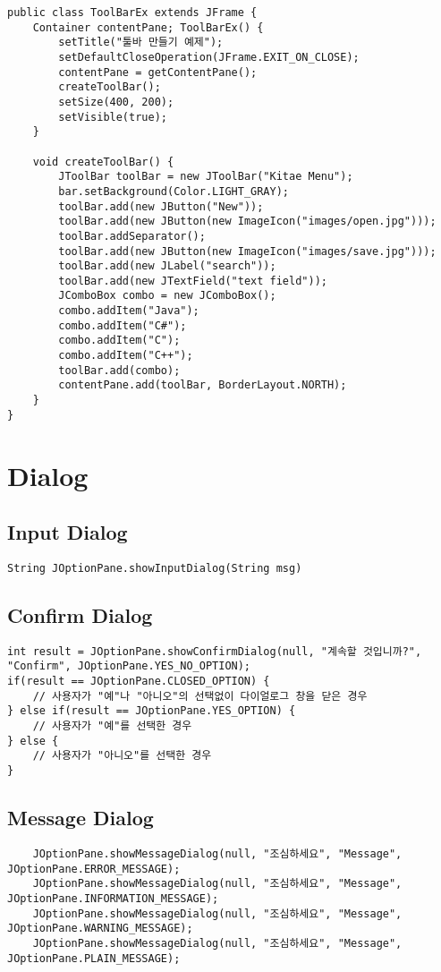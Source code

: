 \begin{verbatim}
public class ToolBarEx extends JFrame {
    Container contentPane; ToolBarEx() {
        setTitle("툴바 만들기 예제");
        setDefaultCloseOperation(JFrame.EXIT_ON_CLOSE);
        contentPane = getContentPane();
        createToolBar();
        setSize(400, 200);
        setVisible(true);
    }

    void createToolBar() {
        JToolBar toolBar = new JToolBar("Kitae Menu");
        bar.setBackground(Color.LIGHT_GRAY);
        toolBar.add(new JButton("New"));
        toolBar.add(new JButton(new ImageIcon("images/open.jpg")));
        toolBar.addSeparator();
        toolBar.add(new JButton(new ImageIcon("images/save.jpg")));
        toolBar.add(new JLabel("search"));
        toolBar.add(new JTextField("text field"));
        JComboBox combo = new JComboBox();
        combo.addItem("Java");
        combo.addItem("C#");
        combo.addItem("C");
        combo.addItem("C++");
        toolBar.add(combo);
        contentPane.add(toolBar, BorderLayout.NORTH);
    }
}
\end{verbatim}

\section{Dialog}
\subsection{Input Dialog}
\texttt{String JOptionPane.showInputDialog(String msg)}

\subsection{Confirm Dialog}
\begin{verbatim}
int result = JOptionPane.showConfirmDialog(null, "계속할 것입니까?", "Confirm", JOptionPane.YES_NO_OPTION);
if(result == JOptionPane.CLOSED_OPTION) {
    // 사용자가 "예"나 "아니오"의 선택없이 다이얼로그 창을 닫은 경우
} else if(result == JOptionPane.YES_OPTION) {
    // 사용자가 "예"를 선택한 경우
} else {
    // 사용자가 "아니오"를 선택한 경우
}
\end{verbatim}

\subsection{Message Dialog}
\begin{verbatim}
    JOptionPane.showMessageDialog(null, "조심하세요", "Message", JOptionPane.ERROR_MESSAGE);
    JOptionPane.showMessageDialog(null, "조심하세요", "Message", JOptionPane.INFORMATION_MESSAGE);
    JOptionPane.showMessageDialog(null, "조심하세요", "Message", JOptionPane.WARNING_MESSAGE);
    JOptionPane.showMessageDialog(null, "조심하세요", "Message", JOptionPane.PLAIN_MESSAGE);
\end{verbatim}

